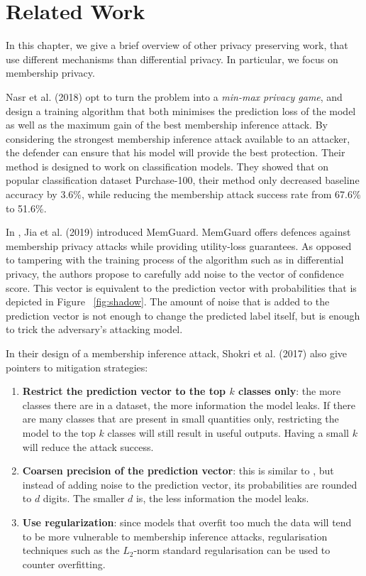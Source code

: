 \chapter{Related Work}\label{chap:related_work}

In this chapter, we give a brief overview of other privacy preserving work, that use different mechanisms than differential privacy. In particular, we focus on membership privacy.

Nasr et al. (2018) \cite{mia_reg} opt to turn the problem into a \textit{min-max privacy game}, and design a training algorithm that both minimises the prediction loss of the model as well as the maximum gain of the best membership inference attack. By considering the strongest membership inference attack available to an attacker, the defender can ensure that his model will provide the best protection. Their method is designed to work on classification models. They showed that on popular classification dataset Purchase-100, their method only decreased baseline accuracy by 3.6\%, while reducing the membership attack success rate from 67.6\% to 51.6\%.

In \cite{mia_memguard}, Jia et al. (2019) introduced MemGuard. MemGuard offers defences against membership privacy attacks while providing utility-loss guarantees. As opposed to tampering with the training process of the algorithm such as in differential privacy, the authors propose to carefully add noise to the vector of confidence score. This vector is equivalent to the prediction vector with probabilities that is depicted in Figure ~\ref{fig:shadow}. The amount of noise that is added to the prediction vector is not enough to change the predicted label itself, but is enough to trick the adversary's attacking model. 

In their design of a membership inference attack, Shokri et al. (2017) \cite{shokri} also give pointers to mitigation strategies:
\begin{enumerate}
	\item \textbf{Restrict the prediction vector to the top $k$ classes only}: the more classes there are in a dataset, the more information the model leaks. If there are many classes that are present in small quantities only, restricting the model to the top $k$ classes will still result in useful outputs. Having a small $k$ will reduce the attack success.
	\item \textbf{Coarsen precision of the prediction vector}: this is similar to \cite{mia_memguard}, but instead of adding noise to the prediction vector, its probabilities are rounded to $d$ digits. The smaller $d$ is, the less information the model leaks.
	\item \textbf{Use regularization}: since models that overfit too much the data will tend to be more vulnerable to membership inference attacks, regularisation techniques such as the $L_2$-norm standard regularisation can be used to counter overfitting.
\end{enumerate}

